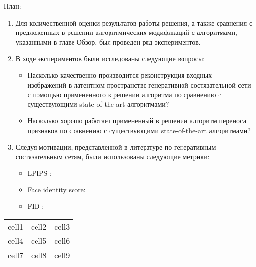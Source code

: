 
План:

\begin{enumerate}

\item 
Для количественной оценки результатов работы решения, а также сравнения с предложенных в решении алгоритмических модификаций с алгоритмами, указанными в главе Обзор, был проведен ряд экспериментов.

\item 
В ходе экспериментов были исследованы следующие вопросы:
\begin{itemize}
    \item 
    Насколько качественно производится реконструкция входных изображений в латентном пространстве генеративной состязательной сети с помощью примененного в решении алгоритма по сравнению с существующими state-of-the-art алгоритмами?
    \item 
    Насколько хорошо работает примененный в решении алгоритм переноса признаков по сравнению с существующими state-of-the-art алгоритмами?
\end{itemize}

\item 
Следуя мотивации, представленной в литературе по генеративным состязательным сетям, были использованы следующие метрики:
\begin{itemize}
    \item 
    LPIPS \cite{zhang2018lpips}:
    \item
    Face identity score:
    \item 
    FID \cite{heusel2017fid}:
\end{itemize}


\end{enumerate}

\begin{center}
\begin{tabular}{ |c|c|c| } 
 \hline
 cell1 & cell2 & cell3 \\ 
 cell4 & cell5 & cell6 \\ 
 cell7 & cell8 & cell9 \\ 
 \hline
\end{tabular}
\end{center}



